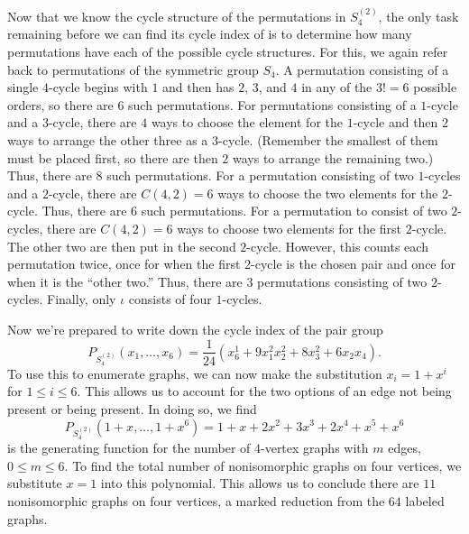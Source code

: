 Now that we know the cycle structure of the permutations in
$S_4^{(2)}$, the only task remaining before we can find its cycle
index of is to determine how many permutations have each of the
possible cycle structures. For this, we again refer back to
permutations of the symmetric group $S_4$. A permutation consisting of
a single $4$-cycle begins with $1$ and then has $2$, $3$, and $4$ in
any of the $3!=6$ possible orders, so there are $6$ such
permutations. For permutations consisting of a $1$-cycle and a
$3$-cycle, there are $4$ ways to choose the element for the $1$-cycle
and then $2$ ways to arrange the other three as a $3$-cycle. (Remember
the smallest of them must be placed first, so there are then $2$ ways
to arrange the remaining two.) Thus, there are $8$ such
permutations. For a permutation consisting of two $1$-cycles and a
$2$-cycle, there are $C(4,2)=6$ ways to choose the two elements for
the $2$-cycle. Thus, there are $6$ such permutations. For a
permutation to consist of two $2$-cycles, there are $C(4,2)=6$ ways to
choose two elements for the first $2$-cycle. The other two are then
put in the second $2$-cycle. However, this counts each permutation
twice, once for when the first $2$-cycle is the chosen pair and once
for when it is the ``other two.'' Thus, there are $3$ permutations
consisting of two $2$-cycles. Finally, only $\iota$ consists of four
$1$-cycles.

Now we're prepared to write down the cycle index of the pair group
\[P_{S_4^{(2)}}(x_1,\dots,x_6) = \frac{1}{24}\left( x_6^1 + 9x_1^2x_2^2 + 8 x_3^2 +
  6x_2x_4\right).\]
To use this to enumerate graphs, we can now make the substitution $x_i
= 1+x^i$ for $1\leq i\leq 6$. This allows us to account for the two
options of an edge not being present or being present. In doing so, we
find
\[P_{S_4^{(2)}}(1+x,\dots,1+x^6)= 1+x+2 x^2+3 x^3+2 x^4+x^5+x^6\]
is the generating function for the number of $4$-vertex graphs with
$m$ edges, $0\leq m\leq 6$. To find the total number of nonisomorphic
graphs on four vertices, we substitute $x=1$ into this
polynomial. This allows us to conclude there are $11$ nonisomorphic
graphs on four vertices, a marked reduction from the $64$ labeled
graphs.

